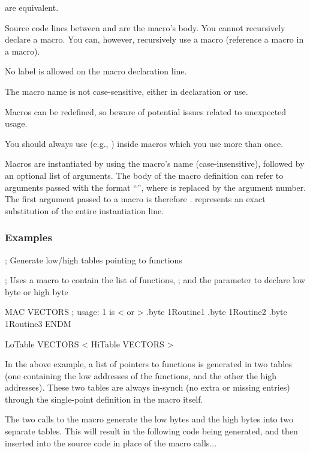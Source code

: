 	 are equivalent.

	
	Source code lines between  and  are the macro's body.
	You cannot recursively declare a macro.  You can, however, recursively
	use a macro (reference a macro in a macro).
		
No label is allowed on the macro declaration line.

The macro name is not case-sensitive, either in declaration or use.

Macros can be redefined, so beware of potential issues related to unexpected usage.

You should always use  (e.g., ) inside macros which you use
more than once.
	
Macros are instantiated by using the macro's name (case-insensitive), followed by an optional list of arguments. The body of the macro definition can refer to arguments passed with the format ``\mono{\{\#\}}'', where \mono{\#} is replaced by the argument number. The first argument passed to a macro is therefore .  represents an exact substitution of the entire instantiation line.
	
	\subsubsection{Examples}
	
\begin{code}[caption=Vector Table Generation using a MACRO]
; Generate low/high tables pointing to functions

; Uses a macro to contain the list of functions,
; and the parameter to declare low byte or high byte
	
  MAC VECTORS
  ; usage: {1} is < or >
    .byte {1}Routine1
    .byte {1}Routine2
    .byte {1}Routine3
  ENDM
	
LoTable VECTORS <
HiTable VECTORS > 
\end{code}
	
In the above example, a list of pointers to functions is generated in two tables (one containing the low addresses of the functions, and the other the high addresses). These two tables are always in-synch (no extra or missing entries) through the single-point definition in the macro itself.

The two calls to the macro generate the low bytes and the high bytes into two separate tables. This will result in the following code being generated, and then inserted into the source code in place of the macro calls...
	

